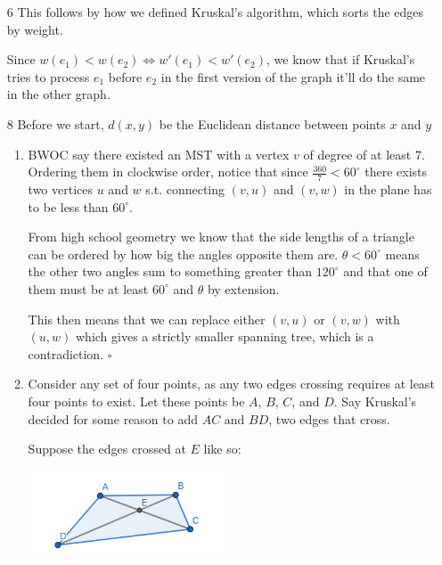\documentclass[12pt]{article}
\begin{document}
\begin{enumerate}
    \item[6] This follows by how we defined Kruskal's algorithm,
        which sorts the edges by weight.

        Since $w(e_1) < w(e_2) \iff w'(e_1) < w'(e_2)$,
        we know that if Kruskal's tries to process $e_1$ before $e_2$
        in the first version of the graph it'll do the same in the other graph.

    \item[8] Before we start, $d(x, y)$ be the Euclidean distance between points $x$ and $y$
        \begin{enumerate}
            \item BWOC say there existed an MST with a vertex $v$ of degree of at least $7$.
                  Ordering them in clockwise order, notice that since $\frac{360}{7} < 60^\circ$
                  there exists two vertices $u$ and $w$ s.t. connecting $(v, u)$ and $(v, w)$
                  in the plane has to be less than $60^\circ$.

                  From high school geometry we know that the side lengths of a triangle
                  can be ordered by how big the angles opposite them are.
                  $\theta < 60^\circ$ means the other two angles sum to something
                  greater than $120^\circ$ and that one of them must be at least
                  $60^\circ$ and $\theta$ by extension.

                  This then means that we can replace either $(v, u)$ or $(v, w)$ with $(u, w)$
                  which gives a strictly smaller spanning tree,
                  which is a contradiction. $\square$

            \item Consider any set of four points, as any two edges crossing
                  requires at least four points to exist.
                  Let these points be $A$, $B$, $C$, and $D$.
                  Say Kruskal's decided for some reason to add $AC$ and $BD$, two edges that cross.

                  Suppose the edges crossed at $E$ like so:
                  \begin{center}
                      \includegraphics[width=6cm]{img/hw4/geo_wth}
                  \end{center}


\end{enumerate}
\end{enumerate}
\end{document}
